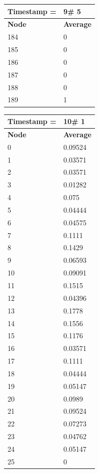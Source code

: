 \begin{tabular}{|l||l|}
\hline
\textbf{Timestamp =} & \textbf{9}\# 5\\\hline
	\textbf{Node} & \textbf{Average} \\ \hline
\hline
	184 & 0 \\ \hline
	185 & 0 \\ \hline
	186 & 0 \\ \hline
	187 & 0 \\ \hline
	188 & 0 \\ \hline
	189 & 1 \\ \hline
\end{tabular}

\begin{tabular}{|l||l|}
\hline
\textbf{Timestamp =} & \textbf{10}\# 1\\\hline
	\textbf{Node} & \textbf{Average} \\ \hline
\hline
	0 & 0.09524 \\ \hline
	1 & 0.03571 \\ \hline
	2 & 0.03571 \\ \hline
	3 & 0.01282 \\ \hline
	4 & 0.075 \\ \hline
	5 & 0.04444 \\ \hline
	6 & 0.04575 \\ \hline
	7 & 0.1111 \\ \hline
	8 & 0.1429 \\ \hline
	9 & 0.06593 \\ \hline
	10 & 0.09091 \\ \hline
	11 & 0.1515 \\ \hline
	12 & 0.04396 \\ \hline
	13 & 0.1778 \\ \hline
	14 & 0.1556 \\ \hline
	15 & 0.1176 \\ \hline
	16 & 0.03571 \\ \hline
	17 & 0.1111 \\ \hline
	18 & 0.04444 \\ \hline
	19 & 0.05147 \\ \hline
	20 & 0.0989 \\ \hline
	21 & 0.09524 \\ \hline
	22 & 0.07273 \\ \hline
	23 & 0.04762 \\ \hline
	24 & 0.05147 \\ \hline
	25 & 0 \\ \hline

\end{tabular}
